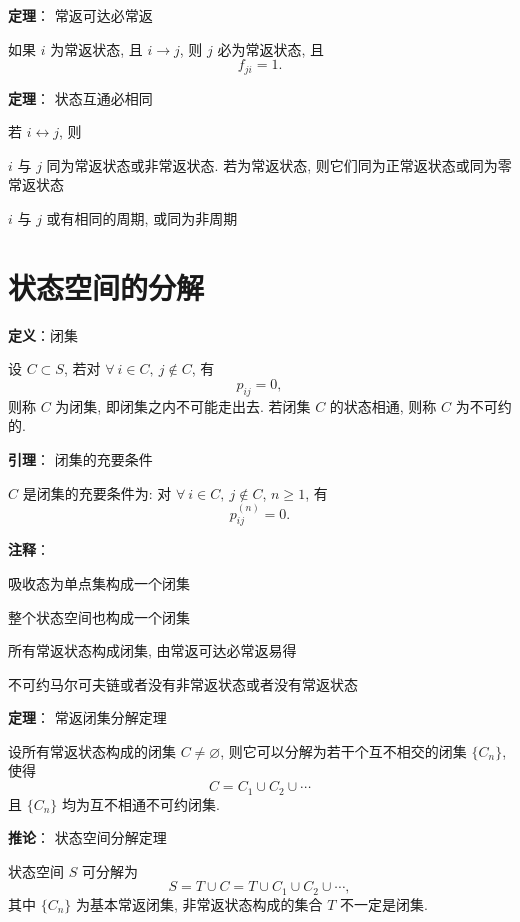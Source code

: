 \documentclass[openany]{ctexbook}
\theoremstyle{kaiti}
\theoremstyle{normal}
\begin{document}
\textbf{定理}： 常返可达必常返

如果 $i$ 为常返状态, 且 $i\to j$, 则 $j$ 必为常返状态, 且
\begin{equation}
  f_{ji}=1.
\end{equation}

\textbf{定理}： 状态互通必相同

若 $i\leftrightarrow j$, 则

$i$ 与 $j$ 同为常返状态或非常返状态. 若为常返状态, 则它们同为正常返状态或同为零常返状态

$i$ 与 $j$ 或有相同的周期, 或同为非周期

\section{状态空间的分解}

\textbf{定义}：闭集

设 $C\subset S$, 若对 $\forall~i\in C,~j\notin C$, 有
\begin{equation}
  p_{ij}=0,
\end{equation}
 则称 $C$ 为闭集, 即闭集之内不可能走出去. 若闭集 $C$ 的状态相通, 则称 $C$ 为不可约的.

\textbf{引理}： 闭集的充要条件

$C$ 是闭集的充要条件为: 对 $\forall~i\in C,~j\notin C$, $n\geqslant1$, 有
\begin{equation}
  p_{ij}^{(n)}=0.
\end{equation}

\textbf{注释}：

吸收态为单点集构成一个闭集

整个状态空间也构成一个闭集

所有常返状态构成闭集, 由常返可达必常返易得

不可约马尔可夫链或者没有非常返状态或者没有常返状态

\textbf{定理}： 常返闭集分解定理

设所有常返状态构成的闭集 $C\neq\varnothing$, 则它可以分解为若干个互不相交的闭集 $\{C_n\}$, 使得
\begin{equation}
  C=C_1\cup C_2\cup\cdots
\end{equation}
且 $\{C_n\}$ 均为互不相通不可约闭集.

\textbf{推论}： 状态空间分解定理

状态空间 $S$ 可分解为
\begin{equation}
  S=T\cup C=T\cup C_1\cup C_2\cup\cdots,
\end{equation}
其中 $\{C_n\}$ 为基本常返闭集, 非常返状态构成的集合 $T$ 不一定是闭集.
\end{document}
